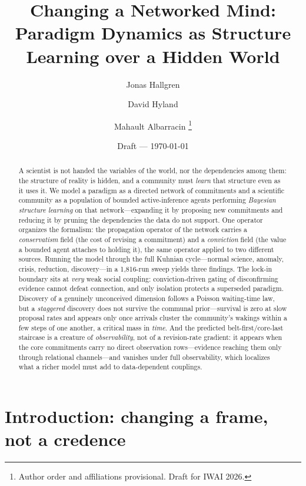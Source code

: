 \documentclass[11pt]{article}
\title{\bfseries Changing a Networked Mind:\\[2pt]
\large Paradigm Dynamics as Structure Learning over a Hidden World}
\author{Jonas Hallgren \and David Hyland \and Mahault Albarracin%
\thanks{Author order and affiliations provisional. Draft for IWAI 2026.}}
\date{Draft --- \today}
\begin{document}
\maketitle

\begin{abstract}
A scientist is not handed the variables of the world, nor the dependencies among them: the structure
of reality is hidden, and a community must \emph{learn} that structure even as it uses it. We model a
paradigm as a directed network of commitments and a scientific community as a population of bounded
active-inference agents performing \emph{Bayesian structure learning} on that network---expanding it
by proposing new commitments and reducing it by pruning the dependencies the data do not support. One
operator organizes the formalism: the propagation operator of the network carries a
\emph{conservatism} field (the cost of revising a commitment) and a \emph{conviction} field (the
value a bounded agent attaches to holding it), the same operator applied to two different sources.
Running the model through the full Kuhnian cycle---normal science, anomaly, crisis, reduction,
discovery---in a 1{,}816-run sweep yields three findings. The lock-in boundary sits at \emph{very}
weak social coupling: conviction-driven gating of disconfirming evidence cannot defeat connection,
and only isolation protects a superseded paradigm. Discovery of a genuinely unconceived dimension
follows a Poisson waiting-time law, but a \emph{staggered} discovery does not survive the communal
prior---survival is zero at slow proposal rates and appears only once arrivals cluster the
community's wakings within a few steps of one another, a critical mass in \emph{time}. And the predicted belt-first/core-last staircase is a creature of \emph{observability},
not of a revision-rate gradient: it appears when the core commitments carry no direct observation
rows---evidence reaching them only through relational channels---and vanishes under full
observability, which localizes what a richer model must add to data-dependent couplings.
\end{abstract}

\section{Introduction: changing a frame, not a credence}
\label{sec:background}
\end{document}
